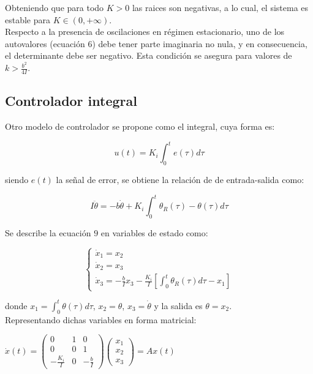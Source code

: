 \documentclass{sig-alternate}
\begin{document}
Obteniendo que para todo $K > 0$ las raices son negativas, a lo cual, el sistema es estable para $K \in (0,+\infty)$.\\
Respecto a la presencia de oscilaciones en r\'egimen estacionario, uno de los autovalores (ecuaci\'on 6) debe tener 
parte imaginaria no nula, y en consecuencia, el determinante debe ser negativo. Esta condici\'on se asegura para 
valores de $k > \frac{b^2}{4I}$. 

\subsection{Controlador integral}\label{integral}
Otro modelo de controlador se propone como el integral, cuya forma es:

\begin{equation}
\label{error_modelo2}
u(t) = K_i \int_0^t e(\tau) d\tau
\end{equation}

siendo $e(t)$ la se\~nal de error, se obtiene la relaci\'{o}n de de entrada-salida como:

\begin{equation}
\label{ecuacion_modelo2}
I \ddot\theta = - b \dot\theta + K_i \int_0^t \theta_R(\tau) - \theta(\tau) d\tau
\end{equation}

Se describe la ecuaci\'on $9$ en variables de estado como:

\begin{equation}
\label{var_estados_model2}
\begin{cases} 
    \dot x_1 = x_2 \\
    \dot x_2 = x_3 \\
    \dot x_3 = -\frac{b}{I} x_3 - \frac{K_i}{I} \left[ \int_0^t \theta_R(\tau) d\tau -x_1 \right]
\end{cases}
\end{equation}

donde $x_1 = \int_0^t \theta(\tau) d\tau$, $x_2 = \theta$, $x_3 = \dot \theta$ y la salida es $\theta=x_2$.\\
Representando dichas variables en forma matricial:

\begin{center}
$
\dot x(t) = 
\left( \begin{array}{ccc}
0 & 1 & 0\\
0 & 0 & 1\\
-\frac{K_i}{I} & 0 & -\frac{b}{I}
\end{array} \right)
\left( \begin{array}{c}
x_1 \\
x_2 \\
x_3
\end{array} \right)
= Ax(t)
$
\end{center}
\end{document}
